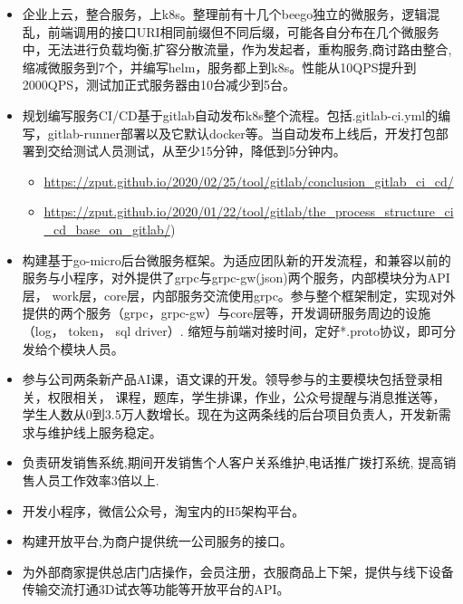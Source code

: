 \documentclass{resume}
\begin{document}
\begin{itemize}[parsep=0.2ex]
   \item 企业上云，整合服务，上k8s。整理前有十几个beego独立的微服务，逻辑混乱，前端调用的接口URI相同前缀但不同后缀，可能各自分布在几个微服务中，无法进行负载均衡,扩容分散流量，作为发起者，重构服务,商讨路由整合, 缩减微服务到7个，并编写helm，服务都上到k8s。性能从10QPS提升到2000QPS，测试加正式服务器由10台减少到5台。

   \item 规划编写服务CI/CD基于gitlab自动发布k8s整个流程。包括.gitlab-ci.yml的编写，gitlab-runner部署以及它默认docker等。当自动发布上线后，开发打包部署到交给测试人员测试，从至少15分钟，降低到5分钟内。
    \begin{itemize}[parsep=0.1ex]
      \item \url{https://zput.github.io/2020/02/25/tool/gitlab/conclusion_gitlab_ci_cd/}
      \item \url{https://zput.github.io/2020/01/22/tool/gitlab/the_process_structure_ci_cd_base_on_gitlab/})
    \end{itemize}

   \item 构建基于go-micro后台微服务框架。为适应团队新的开发流程，和兼容以前的服务与小程序，对外提供了grpc与grpc-gw(json)两个服务，内部模块分为API层， work层，core层，内部服务交流使用grpc。参与整个框架制定，实现对外提供的两个服务（grpc，grpc-gw）与core层等，开发调研服务周边的设施（log， token， sql driver）. 缩短与前端对接时间，定好*.proto协议，即可分发给个模块人员。

   \item  参与公司两条新产品AI课，语文课的开发。领导参与的主要模块包括登录相关，权限相关， 课程，题库，学生排课，作业，公众号提醒与消息推送等，学生人数从0到3.5万人数增长。现在为这两条线的后台项目负责人，开发新需求与维护线上服务稳定。

   \item  负责研发销售系统,期间开发销售个人客户关系维护,电话推广拨打系统, 提高销售人员工作效率3倍以上.
\end{itemize}

\begin{itemize}[parsep=0.2ex]
  \item 开发小程序，微信公众号，淘宝内的H5架构平台。
  \item 构建开放平台,为商户提供统一公司服务的接口。
  \item 为外部商家提供总店门店操作，会员注册，衣服商品上下架，提供与线下设备传输交流打通3D试衣等功能等开放平台的API。
\end{itemize}
\end{document}
